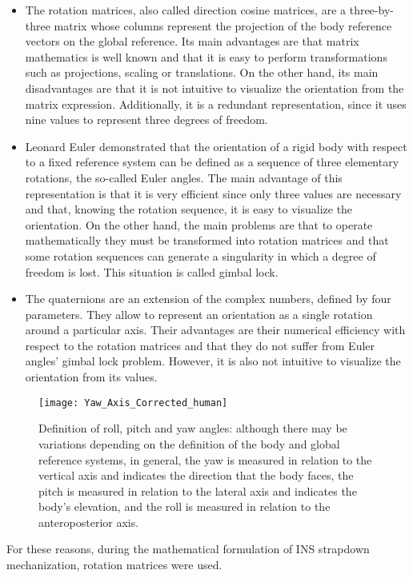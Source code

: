 \begin{itemize}
	\item The rotation matrices, also called direction cosine matrices, are a three-by-three matrix whose columns represent the projection of the body reference vectors on the global reference. Its main advantages are that matrix mathematics is well known and that it is easy to perform transformations such as projections, scaling or translations. 
	On the other hand, its main disadvantages are that it is not intuitive to visualize the orientation from the matrix expression. Additionally, it is a redundant representation, since it uses nine values to represent three degrees of freedom.
	\item Leonard Euler demonstrated that the orientation of a rigid body with respect to a fixed reference system can be defined as a sequence of three elementary rotations, the so-called Euler angles. 
	The main advantage of this representation is that it is very efficient since only three values are necessary and that, knowing the rotation sequence, it is easy to visualize the orientation. 
	On the other hand, the main problems are that to operate mathematically they must be transformed into rotation matrices and that some rotation sequences can generate a singularity in which a degree of freedom is lost. This situation is called gimbal lock.
	\item The quaternions are an extension of the complex numbers, defined by four parameters.
	They allow to represent an orientation as a single rotation around a particular axis. 
	Their advantages are their numerical efficiency with respect to the rotation matrices and that they do not suffer from Euler angles' gimbal lock problem. 
	However, it is also not intuitive to visualize the orientation from its values.
\end{itemize}
\begin{figure}[!t]
	\centering
	\texttt{[image: Yaw\_Axis\_Corrected\_human]}
	\caption[Definition of roll, pitch and yaw angles]{Definition of roll, pitch and yaw angles: although there may be variations depending on the definition of the body and global reference systems, in general, the yaw is measured in relation to the vertical axis and indicates the direction that the body faces, the pitch is measured in relation to the lateral axis and indicates the body's elevation, and the roll is measured in relation to the anteroposterior axis.}
	\label{fig:Euler}
\end{figure}
For these reasons, during the mathematical formulation of INS strapdown mechanization, rotation matrices were used.
